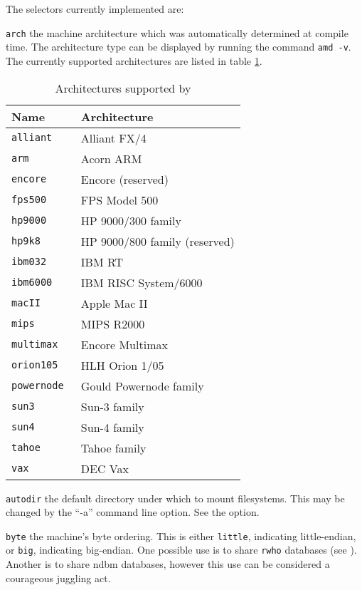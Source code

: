 The selectors currently implemented are:

\begin{list}{}%
{\setlength{\leftmargin}{1.2\labelwidth}}
\item[\tt arch\hfill]
the machine architecture which was automatically determined at compile time.
The architecture type can be displayed by running the command {\tt amd~-v}.
The currently supported architectures are listed in table \ref{table:arch}.
\begin{table}[htb]
\centering
\begin{tabular}{ll}
Name		& Architecture \\ \hline
\tt alliant	& Alliant FX/4 \\
\tt arm		& Acorn ARM \\
\tt encore      & Encore (reserved) \\
\tt fps500	& FPS Model 500 \\
\tt hp9000	& HP 9000/300 family \\
\tt hp9k8       & HP 9000/800 family (reserved) \\
\tt ibm032	& IBM RT \\
\tt ibm6000	& IBM RISC System/6000 \\
\tt macII	& Apple Mac II \\
\tt mips	& MIPS R2000 \\
\tt multimax	& Encore Multimax \\
\tt orion105	& HLH Orion 1/05 \\
\tt powernode	& Gould Powernode family \\
\tt sun3	& Sun-3 family \\
\tt sun4	& Sun-4 family \\
\tt tahoe	& Tahoe family \\
\tt vax		& DEC \sc Vax \\
\end{tabular}
\caption{\label{table:arch}Architectures supported by \amd}
\end{table}

\item[\tt autodir\hfill]
the default directory under which to mount filesystems.
This may be changed by the ``-a'' command line option.
See the  option.

\item[\tt byte\hfill]\label{byte-selector}
the machine's byte ordering.  This is either {\tt little}, indicating
little-endian, or {\tt big}, indicating big-endian.
One possible use is to share {\tt rwho} databases (see ).
Another is to share ndbm databases,
however this use can be considered a courageous juggling act.


\end{list}
